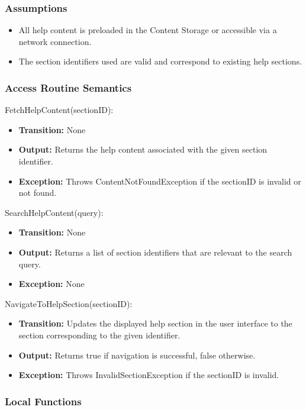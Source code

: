 \documentclass[12pt, titlepage]{article}
\begin{document}
\subsubsection{Assumptions}

\begin{itemize}
  \item All help content is preloaded in the Content Storage or accessible via a network connection.
  \item The section identifiers used are valid and correspond to existing help sections.
\end{itemize}

\subsubsection{Access Routine Semantics}

\noindent FetchHelpContent(sectionID):
\begin{itemize}
  \item \textbf{Transition:} None
  \item \textbf{Output:} Returns the help content associated with the given section identifier.
  \item \textbf{Exception:} Throws ContentNotFoundException if the sectionID is invalid or not found.
\end{itemize}

\noindent SearchHelpContent(query):
\begin{itemize}
  \item \textbf{Transition:} None
  \item \textbf{Output:} Returns a list of section identifiers that are relevant to the search query.
  \item \textbf{Exception:} None
\end{itemize}

\noindent NavigateToHelpSection(sectionID):
\begin{itemize}
  \item \textbf{Transition:} Updates the displayed help section in the user interface to the section corresponding to the given identifier.
  \item \textbf{Output:} Returns true if navigation is successful, false otherwise.
  \item \textbf{Exception:} Throws InvalidSectionException if the sectionID is invalid.
\end{itemize}

\subsubsection{Local Functions}
\end{document}
